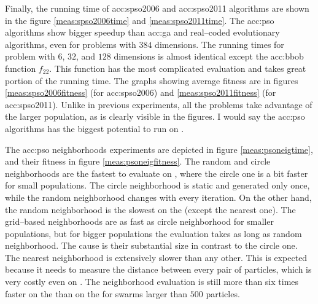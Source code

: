 Finally, the running time of \acrshort{acc:spso2006} and \acrshort{acc:spso2011} algorithms are shown in the figure \ref{meas:spso2006time} and \ref{meas:spso2011time}. The \acrshort{acc:pso} algorithms show bigger speedup than \acrshort{acc:ga} and real--coded evolutionary algorithms, even for problems with $384$ dimensions. The running times for problem with $6$, $32$, and $128$ dimensions is almost identical except the \acrshort{acc:bbob} function $f_{22}$. This function has the most complicated evaluation and takes great portion of the running time. The graphs showing average fitness are in figures \ref{meas:spso2006fitness} (for \acrshort{acc:spso2006}) and \ref{meas:spso2011fitness} (for \acrshort{acc:spso2011}). Unlike in previous experiments, all the problems take advantage of the larger population, as is clearly visible in the figures. I would say the \acrshort{acc:pso} algorithms has the biggest potential to run on \gpuns.

The \acrshort{acc:pso} neighborhoods experiments are depicted in figure \ref{meas:psoneigtime}, and their fitness in figure \ref{meas:psoneigfitness}. The random and circle neighborhoods are the fastest to evaluate on \gpuns, where the circle one is a bit faster for small populations. The circle neighborhood is static and generated only once, while the random neighborhood changes with every iteration. On the other hand, the random neighborhood is the slowest on the \cpu (except the nearest one). The grid--based neighborhoods are as fast as circle neighborhood for smaller populations, but for bigger populations the evaluation takes as long as random neighborhood. The cause is their substantial size in contrast to the circle one. The nearest neighborhood is extensively slower than any other. This is expected because it needs to measure the distance between every pair of particles, which is very costly even on \gpuns. The neighborhood evaluation is still more than six times faster on the \gpu than on the \cpu for swarms larger than $500$ particles.